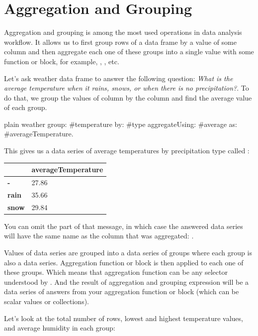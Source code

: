\documentclass[10pt,twoside,english]{_support/latex/sbabook/sbabook}
\begin{document}
\section{Aggregation and Grouping}
Aggregation and grouping is among the most used operations in data analysis workflow. It allows us to first group rows of a data frame by a value of some column and then aggregate each one of these groups into a single value with some function or block, for example, , , etc.

Let's ask weather data frame to answer the following question: \textit{What is the average temperature when it rains, snows, or when there is no precipitation?}. To do that, we group the values of  column by the  column and find the average value of each group.

\begin{displaycode}{plain}
weather
	group: #temperature
	by: #type
	aggregateUsing: #average
  as: #averageTemperature.
\end{displaycode}

This gives us a data series of average temperatures by precipitation type called :

\begin{tabular}{ll}
\toprule
 & \textbf{averageTemperature} \\
\midrule
\textbf{-} & 27.86 \\
\textbf{rain} & 35.66 \\
\textbf{snow} & 29.84 \\
\bottomrule
\end{tabular}

You can omit the  part of that message, in which case the answered data series will have the same name as the column that was aggregated: .

Values of data series are grouped into a data series of groups where each group is also a data series. Aggregation function or block is then applied to each one of these groups. Which means that aggregation function can be any selector understood by . And the result of aggregation and grouping expression will be a data series of answers from your aggregation function or block (which can be scalar values or collections).

Let's look at the total number of rows, lowest and highest temperature values, and average humidity in each group:
\end{document}
